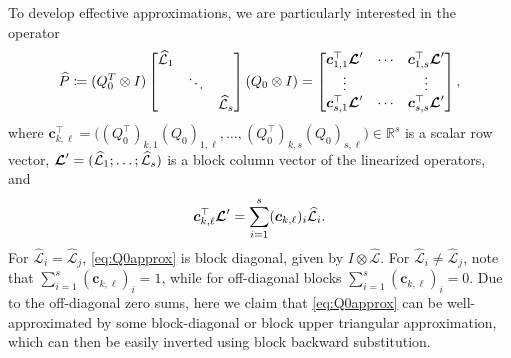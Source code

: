 \documentclass[review]{siamart}
\begin{document}

To develop effective approximations, we are particularly interested in the operator
%
\begin{align}\label{eq:Q0approx}
\widehat{P} \coloneqq (Q_0^T\otimes I) \begin{bmatrix}
	\widehat{\mathcal{L}}_1  & \\ & \ddots \\ && \widehat{\mathcal{L}}_s\end{bmatrix}
	(Q_0\otimes I)
= \begin{bmatrix}
	\bm{c}^\top_{1,1} \bm{{\cal L}}' & \cdots & \bm{c}^\top_{1,s} \bm{{\cal L}}' \\
	\vdots & & \vdots \\
	\bm{c}^\top_{s,1} \bm{{\cal L}}' & \cdots & \bm{c}^\top_{s,s} \bm{{\cal L}}'
	\end{bmatrix},
\end{align}
%
where $\bm{c}^\top_{k,\ell} = \Big((Q_0^\top)_{k ,1} (Q_0)_{1, \ell},
\ldots, (Q_0^\top)_{k, s} (Q_0)_{s, \ell} \Big) \in \mathbb{R}^s$ is a scalar row
vector, $\bm{{\cal L}}' = (\widehat{\mathcal{L}}_1; \ldots; \widehat{\mathcal{L}}_s)$
is a block column vector of the linearized operators, and
%
\begin{align*}
\bm{c}^\top_{k,\ell} \bm{{\cal L}}' = \sum \limits_{i = 1}^s (\bm{c}_{k, \ell})_i
	\widehat{\mathcal{L}}_i.
\end{align*}
%
For $\widehat{\mathcal{L}}_i = \widehat{\mathcal{L}}_j$, \eqref{eq:Q0approx}
is block diagonal, given by $I\otimes\widehat{\mathcal{L}}$. For
$\widehat{\mathcal{L}}_i \neq \widehat{\mathcal{L}}_j$, note that
$\sum_{i=1}^s (\bm{c}_{k, \ell})_i = 1$, while for off-diagonal blocks
$\sum_{i=1}^s (\bm{c}_{k, \ell})_i = 0$.
Due to the off-diagonal zero sums, here we claim that \eqref{eq:Q0approx}
can be well-approximated by some block-diagonal or block upper triangular
approximation, which can then be easily inverted using block backward
substitution.
\end{document}
